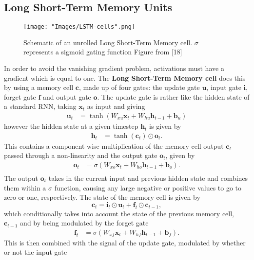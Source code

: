 \documentclass[]{article}
\begin{document}
\subsection{Long Short-Term Memory Units}
\begin{figure}	\centering
	\texttt{[image: "Images/LSTM-cells".png]}
	\caption{Schematic of an unrolled Long Short-Term Memory cell. $\sigma$ represents a sigmoid gating function Figure from [18]}
	\label{fig:encoder-decoder}
\end{figure}
In order to avoid the vanishing gradient problem, activations must have a gradient which is equal to one. The \textbf{Long Short-Term Memory cell} does this by using a memory cell $\textbf{c}$, made up of four gates: the update gate $\textbf{u}$, input gate $\textbf{i}$, forget gate $\textbf{f}$ and output gate $\textbf{o}$. The update gate is rather like the hidden state of a standard RNN, taking $\textbf{x}_t$ as input and giving
\begin{align}
\textbf{u}_t&=\tanh(W_{xu}\textbf{x}_t+W_{hu}\textbf{h}_{t-1}+\textbf{b}_u)
\end{align}
however the hidden state at a given timestep $\textbf{h}_{t}$ is given by
\begin{align}
\label{eq:hiddenLSTM}
\textbf{h}_{t}&= \tanh(\textbf{c}_t) \odot \textbf{o}_t.
\end{align}
This contains a component-wise multiplication of the memory cell output $\textbf{c}_t$ passed through a non-linearity and the output gate $\textbf{o}_t$, given by
\begin{align}
\textbf{o}_{t}&=\sigma(W_{xo}\textbf{x}_t+W_{ho}\textbf{h}_{t-1}+\textbf{b}_o).\\
\end{align}
The output $\textbf{o}_t$ takes in the current input and previous hidden state and combines them within a $\sigma$ function, causing any large negative or positive values to go to zero or one, respectively. The state of the memory cell is given by
\begin{equation}
	\textbf{c}_{t}=\textbf{i}_t\odot \textbf{u}_t + \textbf{f}_t\odot\textbf{c}_{t-1},
\end{equation}
which conditionally takes into account the state of the previous memory cell, $\textbf{c}_{t-1}$ and by being modulated by the forget gate
\begin{align}
\textbf{f}_{t}&=\sigma(W_{xf}\textbf{x}_t+W_{hf}\textbf{h}_{t-1}+\textbf{b}_f).
\end{align}
This is then combined with the signal of the update gate, modulated by whether or not the input gate
\end{document}
